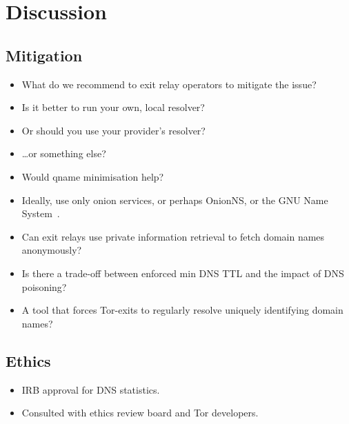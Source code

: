 \section{Discussion}
\label{sec:discussion}

\subsection{Mitigation}
\begin{itemize}
	\item What do we recommend to exit relay operators to mitigate the issue?
	\item Is it better to run your own, local resolver?
	\item Or should you use your provider's resolver?
	\item \ldots or something else?
	\item Would qname minimisation help?
	\item Ideally, use only onion services, or perhaps OnionNS, or the GNU Name
		System~\cite{Wachs2014a}.
	\item Can exit relays use private information retrieval to fetch domain
		names anonymously?
	\item Is there a trade-off between enforced min DNS TTL and the impact of
		DNS poisoning?
	\item A tool that forces Tor-exits to regularly resolve uniquely identifying
		domain names?
\end{itemize}

\subsection{Ethics}
\begin{itemize}
	\item IRB approval for DNS statistics.
	\item Consulted with ethics review board and Tor developers.
\end{itemize}
